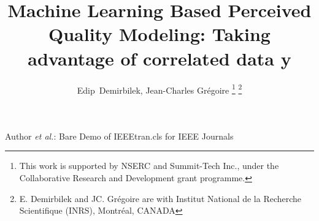 \documentclass[journal]{IEEEtran}
\title{Machine Learning Based Perceived Quality Modeling: Taking advantage of correlated data y}
\author{Edip~Demirbilek, 
Jean-Charles Gr{\'e}goire
\thanks{This work is supported by NSERC and Summit-Tech Inc., under the Collaborative Research and Development grant programme.}%
\thanks{E. Demirbilek and JC. Gr{\'e}goire are with Institut National de la Recherche Scientifique (INRS), Montr{\'e}al, CANADA}%
}%
\begin{document}

%
%



%
{Author \MakeLowercase{\textit{et al.}}: Bare Demo of IEEEtran.cls for IEEE Journals}
%











\maketitle
\end{document}
